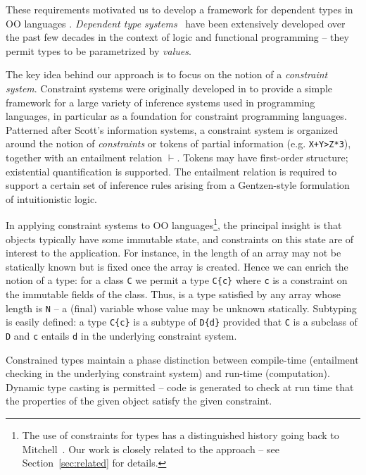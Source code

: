 These requirements motivated us to develop a framework for dependent
types in OO languages \cite{constrained-types}.  {\em Dependent type
systems}~\cite{dependent-types,xi99dependent,ocrz-ecoop03,aspinall-attapl,cayenne,epigram-matter,calc-constructions}
have been extensively developed over the past few decades in the
context of logic and functional programming -- they permit types to be
parametrized by {\em values}.

The key idea behind our approach is to focus on the notion of a {\em
constraint system}. Constraint systems were originally developed in
\cite{cccc} to provide a simple framework for a large variety of
inference systems used in programming languages, in particular as a
foundation for constraint programming languages.  Patterned after
Scott's information systems, a constraint system is
organized around the notion of {\em constraints} or tokens of partial
information (e.g.{} {\tt X+Y>Z*3}), together with an entailment
relation $\vdash$.  Tokens may have first-order structure; existential
quantification is supported. The entailment relation is required to
support a certain set of inference rules arising from a Gentzen-style
formulation of intuitionistic logic.

In applying constraint systems to OO languages\footnote{The use of constraints for types has a distinguished
history going back to Mitchell~\cite{mitchell84}. Our work is closely related to the \hmx{}
approach \cite{sulzmann97type} -- see Section~\ref{sec:related} for details.}, the principal insight
is that objects typically have some immutable state, and constraints on
this state are of interest to the application.  For instance, in \Java{}
the length of an array may not be statically known but is fixed once
the array is created. Hence we can enrich the notion of a type: for a
class {\tt C} we permit a type {\tt C\{c\}} where {\tt c} is a
constraint on the immutable fields of the class. Thus, 
 is a type satisfied by any array whose length
is {\tt N} -- a (final) variable whose value may be unknown
statically. Subtyping is easily defined: a type {\tt C\{c\}} is a
subtype of {\tt D\{d\}} 
provided that {\tt C} is a subclass of {\tt D} and {\tt c}
entails {\tt d} in the underlying constraint system.

Constrained types maintain a phase distinction between compile-time
(entailment checking in the underlying constraint system) and run-time
(computation).  Dynamic type casting is permitted -- code is generated
to check at run time that the properties of the given object satisfy
the given constraint.

